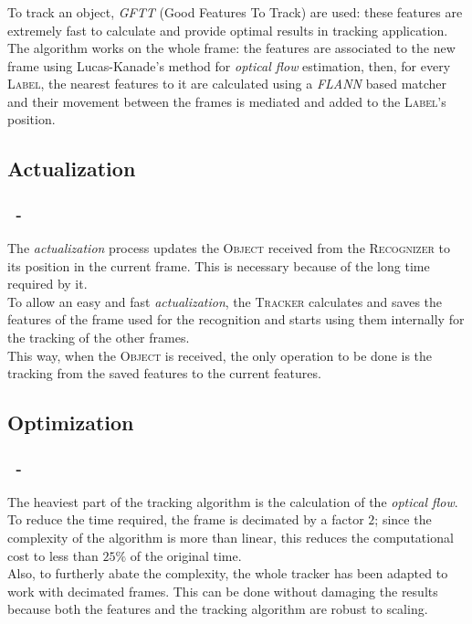 \documentclass{beamer}
\begin{document}
  \begin{frame}
    \frametitle{\insertsection}
    To track an object, \emph{GFTT} (Good Features To Track) are used:
    these features are extremely fast to calculate and provide optimal results
    in tracking application.\\
    The algorithm works on the whole frame: the features are associated to the
    new frame using Lucas-Kanade's method for \emph{optical flow} estimation,
    then, for every \textsc{Label}, the nearest features to it are calculated
    using a \emph{FLANN} based matcher and their movement between the frames is
    mediated and added to the \textsc{Label}'s position.
  \end{frame}

  \subsection{Actualization}

  \begin{frame}
    \frametitle{\insertsection\ - \insertsubsection}
    The \emph{actualization} process updates the \textsc{Object} received from
    the \textsc{Recognizer} to its position in the current frame. This is
    necessary because of the long time required by it.\\
    To allow an easy and fast \emph{actualization}, the \textsc{Tracker}
    calculates and saves the features of the frame used for the recognition
    and starts using them internally for the tracking of the other frames.\\
    This way, when the \textsc{Object} is received, the only operation to be
    done is the tracking from the saved features to the current features.\\
  \end{frame}
  
  \subsection{Optimization}

  \begin{frame}
    \frametitle{\insertsection\ - \insertsubsection}
    The heaviest part of the tracking algorithm is the calculation of the
        \emph{optical flow}. To reduce the time required, the frame is
        decimated by a factor $2$; since the complexity of the algorithm is
        more than linear, this reduces the computational cost to less than
        $25\%$ of the original time.\\
    Also, to furtherly abate the complexity, the whole tracker has been
    adapted to work with decimated frames. This can be done without damaging
    the results because both the features and the tracking algorithm are
        robust to scaling.\\
  \end{frame}
\end{document}
